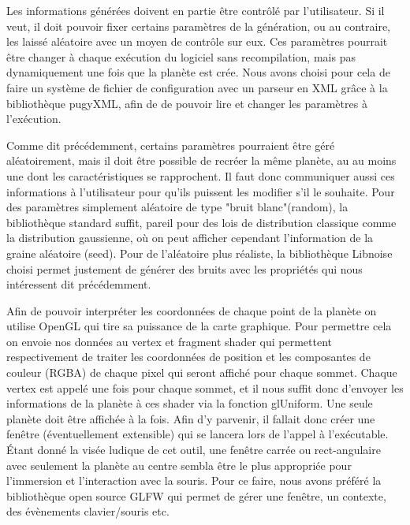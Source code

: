 \documentclass[a4paper]{article}
\begin{document}
\label{besoin_paramètres}
Les informations générées doivent en partie être contrôlé par l'utilisateur. Si il veut, il doit pouvoir fixer certains paramètres de la génération, ou au contraire, les laissé aléatoire avec un moyen de contrôle sur eux. Ces paramètres pourrait être changer à chaque exécution du logiciel sans recompilation, mais pas dynamiquement une fois que la planète est crée. Nous avons choisi pour cela de faire un système de fichier de configuration avec un parseur en XML grâce à la bibliothèque pugyXML, afin de de pouvoir lire et changer les paramètres à l'exécution.

\label{besoin_aleatory}
Comme dit précédemment, certains paramètres pourraient être géré aléatoirement, mais il doit être possible de recréer la même planète, au au moins une dont les caractéristiques se rapprochent.
Il faut donc communiquer aussi ces informations à l'utilisateur pour qu'ils puissent les modifier s'il le souhaite. 
Pour des paramètres simplement aléatoire de type "bruit blanc"(random), la bibliothèque standard suffit, pareil pour des lois de distribution classique comme la distribution gaussienne, où on peut afficher cependant l'information de la graine aléatoire (seed). Pour de l'aléatoire plus réaliste, la bibliothèque Libnoise choisi permet justement de générer des bruits avec les propriétés qui nous intéressent dit précédemment.


Afin de pouvoir interpréter les coordonnées de chaque point de la planète on utilise OpenGL qui tire sa puissance de la carte graphique. Pour permettre cela on envoie nos données au vertex et fragment shader qui permettent respectivement de traiter les coordonnées de position et les composantes de couleur (RGBA) de chaque pixel qui seront affiché pour chaque sommet. Chaque vertex est appelé une fois pour chaque sommet, et il nous suffit donc d'envoyer les informations de la planète à ces shader via la fonction glUniform. \cite{BookShader}
Une seule planète doit être affichée à la fois.  Afin d’y parvenir, il fallait donc créer une fenêtre (éventuellement extensible) qui se lancera lors de l’appel à l’exécutable. Étant donné la visée ludique de cet outil, une fenêtre carrée ou rect-angulaire avec seulement la planète au centre sembla être le plus appropriée pour l’immersion et l’interaction avec la souris. Pour ce faire, nous avons préféré la bibliothèque open source GLFW qui permet de gérer une fenêtre, un contexte, des évènements clavier/souris etc.
\end{document}
